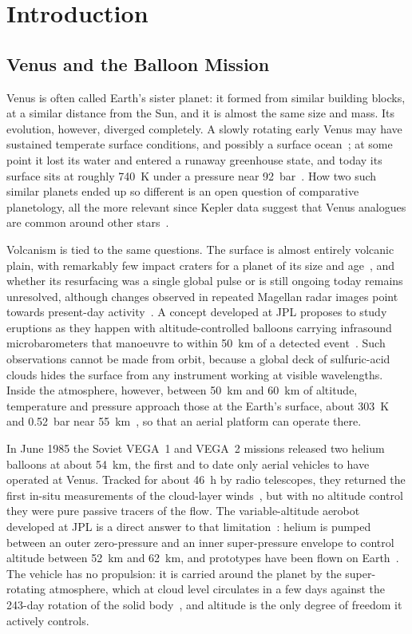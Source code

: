 \documentclass[preprint,12pt,a4paper]{elsarticle}
\begin{document}
\section{Introduction}\label{sec:intro}
\subsection{Venus and the Balloon Mission}\label{sec:venus}

Venus is often called Earth's sister planet: it formed from similar building blocks, at a
similar distance from the Sun, and it is almost the same size and mass.
Its evolution, however, diverged completely.
A slowly rotating early Venus may have sustained temperate surface conditions, and
possibly a surface ocean~\cite{Way2016}; at some point it lost its water and entered a
runaway greenhouse state, and today its surface sits at roughly \SI{740}{K} under a
pressure near \SI{92}{bar}~\cite{SanchezLavega2017}.
How two such similar planets ended up so different is an open question of comparative
planetology, all the more relevant since Kepler data suggest that Venus analogues are common around
other stars~\cite{Kane2014}.

Volcanism is tied to the same questions.
The surface is almost entirely volcanic plain, with remarkably few impact craters for a
planet of its size and age~\cite{Schaber1992}, and whether its resurfacing was a single
global pulse or is still ongoing today remains unresolved, although changes observed in
repeated Magellan radar images point towards present-day activity~\cite{Herrick2023}.
A concept developed at JPL proposes to study eruptions as they happen with
altitude-controlled balloons carrying infrasound microbarometers that manoeuvre to within
\SI{50}{km} of a detected event~\cite{Rossi2023}.
Such observations cannot be made from orbit, because a global deck of
sulfuric-acid clouds hides the surface from any instrument working at visible wavelengths.
Inside the atmosphere, however, between \SI{50}{km} and \SI{60}{km} of altitude,
temperature and pressure approach those at the Earth's surface, about \SI{303}{K} and
\SI{0.52}{bar} near \SI{55}{km}~\cite{Lebonnois2023}, so that an aerial platform can
operate there.

In June 1985 the Soviet VEGA~1 and VEGA~2 missions released two helium balloons at about
\SI{54}{km}, the first and to date only aerial vehicles to have operated at Venus.
Tracked for about \SI{46}{h} by radio telescopes, they returned the first in-situ
measurements of the cloud-layer winds~\cite{Sagdeev1986}, but with no altitude control
they were pure passive tracers of the flow.
The variable-altitude aerobot developed at JPL is a direct answer to that
limitation~\cite{Hall2021}: helium is pumped between an outer zero-pressure and an inner
super-pressure envelope to control altitude between \SI{52}{km}
and \SI{62}{km}, and prototypes have been flown on Earth~\cite{Izraelevitz2025}.
The vehicle has no propulsion: it is carried around the planet by the super-rotating
atmosphere, which at cloud level circulates in a few days against the 243-day rotation of
the solid body~\cite{SanchezLavega2008,SanchezLavega2017}, and altitude is the only degree
of freedom it actively controls.
\end{document}
